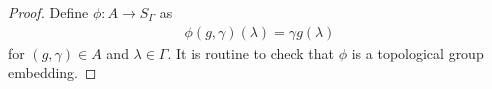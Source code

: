 \documentclass[11pt]{amsart}
\theoremstyle{definition}
\theoremstyle{remark}
\numberwithin{equation}{section}
\def\aut{{\mathrm{Aut}}}
\begin{document}
\begin{proof}
    Define $\phi:A\to S_\Gamma$ as
    \begin{align*}
        \phi(g,\gamma)(\lambda)=\gamma g(\lambda)
    \end{align*}
    for $(g,\gamma)\in A$ and $\lambda\in\Gamma$.
    It is routine to check that $\phi$ is a topological group embedding.


\end{proof}
\end{document}
